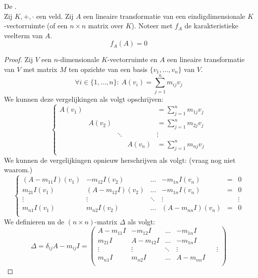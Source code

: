 \documentclass[main.tex]{subfiles}
\begin{document}
\begin{st}
  De .\\
  Zij $K,+,\cdot$ een veld.
  Zij $A$ een lineaire transformatie van een eindigdimensionale $K$-vectorruimte (of een $n\times n$ matrix over $K$). Noteer met $f_{A}$ de karakteristieke veelterm van $A$.
  \[ f_{A}(A) = 0 \]

  \begin{proof}
    Zij $V$ een $n$-dimensionale $K$-vectorruimte en $A$ een lineaire transformatie van $V$ met matrix $M$ ten opzichte van een basis $\{v_{1},\dotsc,v_{n}\}$ van $V$.
    \[ \forall i \in \{1,\dotsc,n\}:\ A(v_{i}) = \sum_{j=1}^{n}m_{ij}v_{j} \]
    We kunnen deze vergelijkingen als volgt opschrijven:
    \[
    \left\{
      \begin{array}{cccccc}
        A(v_{1}) &          &       && =\sum_{j=1}^{n}m_{1j}v_{j}\\
        & A(v_{2}) &       && =\sum_{j=1}^{n}m_{2j}v_{j}\\
        &         & \ddots && \vdots\\
        &         &        & A(v_{n}) &=\sum_{j=1}^{n}m_{nj}v_{j}\\
      \end{array}
    \right.
    \]
    We kunnen de vergelijkingen opnieuw herschrijven als volgt: (vraag nog niet waarom.)
    \[
    \left\{
      \begin{array}{ccccccc}
        (A-m_{11}I)(v_{1}) & -m_{12}I(v_{2}) & \hdots & -m_{1n}I(v_{n}) &=& 0\\
        m_{21}I(v_{1}) & (A-m_{12}I)(v_{2}) & \hdots & -m_{1n}I(v_{n}) &=& 0\\
        \vdots & \vdots &\ddots & \vdots & &\vdots\\
        m_{n1}I(v_{1}) & m_{n2}I(v_{2}) & \hdots & (A-m_{nn}I)(v_{n}) &=& 0\\
      \end{array}
    \right.
    \]
    We definieren nu de $(n\times n)$-matrix $\Delta$ als volgt:
    \[
    \Delta = \delta_{ij}A - m_{ij}I = 
    \begin{pmatrix}
      A-m_{11}I & -m_{12}I & \hdots & -m_{1n}I\\
      m_{21}I & A-m_{12}I & \hdots & -m_{1n}I\\
      \vdots & \vdots &\ddots & \vdots & &\vdots\\
      m_{n1}I & m_{n2}I & \hdots & A-m_{nn}I\\
    \end{pmatrix}
\]
\end{proof}
\end{st}
\end{document}
